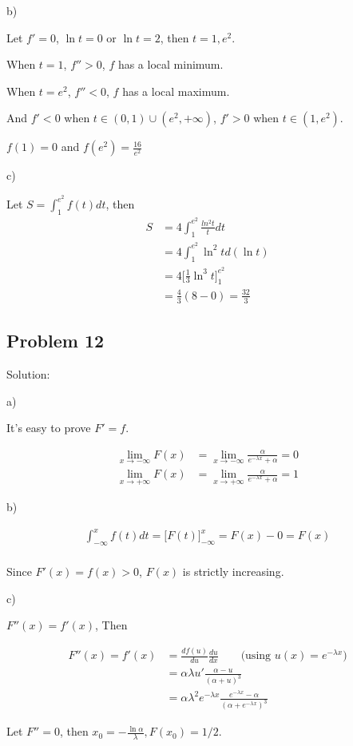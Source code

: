 \documentclass[letterpaper, 11pt]{article}
\newcommand{\1}{\mathds{1}}	%
\theoremstyle{definition}
\begin{document}
  b)

  Let $f' = 0$, $\ln t = 0$ or $\ln t = 2$, then $t = 1, e ^{2}$.

  When $ t = 1$, $f'' > 0$, $f$ has a local minimum.

  When $ t = e ^{2}$, $f '' < 0$, $f$ has a local maximum.

  And $f' < 0$ when $t \in (0, 1) \cup (e ^{2}, +\infty)$, $f' > 0$ when $t \in (1, e ^{2})$.

$f(1) = 0$ and $f(e ^{2}) = \frac{16}{e ^{2}}$


  c)

  Let $S = \int_{1}^{e ^{2}} f(t)dt$, then
  \begin{align*}
    S & = 4\int_{1}^{e ^{2}} \frac{ln ^{2} t}{t} dt         \\
      & = 4 \int_{1}^{e ^{2}} \ln ^{2} t d(\ln t)           \\
      & = 4 \Big[ \frac{1}{3} \ln ^{3} t \Big]_{1}^{e ^{2}} \\
      & = \frac{4}{3}(8 - 0) = \frac{32}{3}
  \end{align*}


  \subsection*{Problem 12}

  Solution:

  a)

  It's easy to prove $F' = f$.

  \begin{align*}
    \lim_{x \to -\infty} F(x) & = \lim_{x \to -\infty} \frac{\alpha}{e ^{- \lambda x} + \alpha} = 0 \\
    \lim_{x \to +\infty} F(x) & =\lim_{x \to +\infty} \frac{\alpha}{e ^{- \lambda x} + \alpha} = 1
  \end{align*}

  b)

  \begin{align*}
    \int_{-\infty }^{x} f(t) dt = \Big[ F(t) \Big]_{- \infty }^{x} = F(x) -0 = F(x) \\
  \end{align*}

  Since $  F'(x) = f(x) >0$, $F(x)$ is strictly increasing.

  c)

$F''(x) = f'(x)$, Then

  \begin{align*}
    F''(x) = f'(x) & = \frac{df(u)}{du} \frac{du}{dx} \qquad \text{(using $u(x) = e ^{-\lambda x}$)}                          \\
                   & = \alpha \lambda u' \frac{\alpha - u}{(\alpha + u)^{3}}                                                  \\
                   & = \alpha \lambda ^{2} e ^{- \lambda x} \frac{e ^{- \lambda x} - \alpha}{(\alpha + e ^{- \lambda x})^{3}}
  \end{align*}

  Let $F'' = 0$, then $x_{0} = -\frac{\ln \alpha}{\lambda}, F(x_{0}) = 1/2$.


\end{document}
